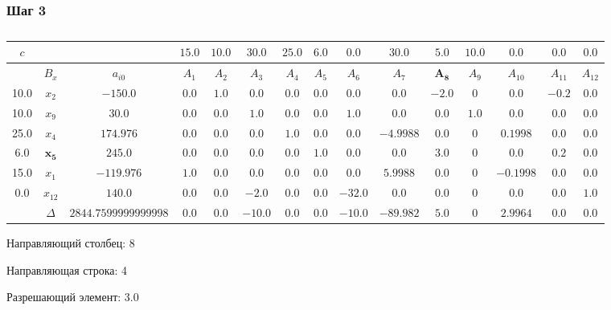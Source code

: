 \begin{landscape}

\subsubsection{Шаг 3}

\begin{table}[H]
	\centering
	\normalsize
	\caption{}
	\label{tbl:1}
	\begin{tabular}{|c|c|c|c|c|c|c|c|c|c|c|c|c|c|c|}
		\hline
		$c$&&&$15.0$&$10.0$&$30.0$&$25.0$&$6.0$&$0.0$&$30.0$&$5.0$&$10.0$&$0.0$&$0.0$&$0.0$\\ \hline
		&$B_x$&$a_{i0}$&$A_{1}$&$A_{2}$&$A_{3}$&$A_{4}$&$A_{5}$&$A_{6}$&$A_{7}$&$\mathbf{A_{8}}$&$A_{9}$&$A_{10}$&$A_{11}$&$A_{12}$\\ \hline
		10.0&$x_{2}$&$-150.0$&$0.0$&$1.0$&$0.0$&$0.0$&$0.0$&$0.0$&$0.0$&$-2.0$&$0$&$0.0$&$-0.2$&$0.0$\\ \hline
		10.0&$x_{9}$&$30.0$&$0.0$&$0.0$&$1.0$&$0.0$&$0.0$&$1.0$&$0.0$&$0.0$&$1.0$&$0.0$&$0.0$&$0.0$\\ \hline
		25.0&$x_{4}$&$174.976$&$0.0$&$0.0$&$0.0$&$1.0$&$0.0$&$0.0$&$-4.9988$&$0.0$&$0$&$0.1998$&$0.0$&$0.0$\\ \hline
		$6.0$&$\mathbf{x_{5}}$&$245.0$&$0.0$&$0.0$&$0.0$&$0.0$&$1.0$&$0.0$&$0.0$&$\mathbf{3.0}$&$0$&$0.0$&$0.2$&$0.0$\\ \hline
		15.0&$x_{1}$&$-119.976$&$1.0$&$0.0$&$0.0$&$0.0$&$0.0$&$0.0$&$5.9988$&$0.0$&$0$&$-0.1998$&$0.0$&$0.0$\\ \hline
		0.0&$x_{12}$&$140.0$&$0.0$&$0.0$&$-2.0$&$0.0$&$0.0$&$-32.0$&$0.0$&$0.0$&$0$&$0.0$&$0.0$&$1.0$\\ \hline
		&$\Delta$&$2844.7599999999998$&$0.0$&$0.0$&$-10.0$&$0.0$&$0.0$&$-10.0$&$-89.982$&$5.0$&$0$&$2.9964$&$0.0$&$0.0$\\ \hline

\end{tabular}

\end{table}

Направляющий столбец: 8

Направляющая строка: 4

Разрешающий элемент: 3.0

\end{landscape}

